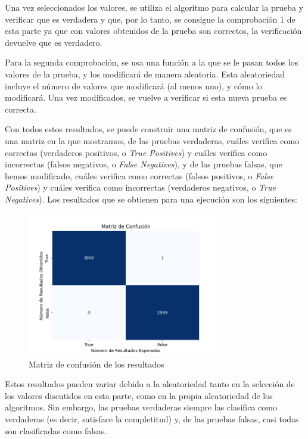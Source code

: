 Una vez seleccionados los valores, se utiliza el algoritmo para calcular la prueba y verificar que es verdadera y que, por lo tanto, se consigue la comprobación 1 de esta parte ya que con valores obtenidos de la prueba son correctos, la verificación devuelve que es verdadero.

Para la segunda comprobación, se usa una función a la que se le pasan todos los valores de la prueba, y los modificará de manera aleatoria. Esta aleatoriedad incluye el número de valores que modificará (al menos uno), y cómo lo modificará. Una vez modificados, se vuelve a verificar si esta nueva prueba es correcta.

Con todos estos resultados, se puede construir una matriz de confusión, que es una matriz en la que mostramos, de las pruebas verdaderas, cuáles verifica como correctas (verdaderos positivos, o \emph{True Positives}) y cuáles verifica como incorrectas (falsos negativos, o \emph{False Negatives}), y de las pruebas falsas, que hemos modificado, cuáles verifica como correctas (falsos positivos, o \emph{False Positives}) y cuáles verifica como incorrectas (verdaderos negativos, o \emph{True Negatives}). Los resultados que se obtienen para una ejecución son los siguientes:

\begin{figure}[H]
    \centering
    \includegraphics[width=0.75\textwidth]{images/Resultados test.png}
    \caption{Matriz de confusión de los resultados}
\end{figure}

Estos resultados pueden variar debido a la aleatoriedad tanto en la selección de los valores discutidos en esta parte, como en la propia aleatoriedad de los algoritmos. Sin embargo, las pruebas verdaderas siempre las clasifica como verdaderas (es decir, satisface la completitud) y, de las pruebas falsas, casi todas son clasificadas como falsas.

